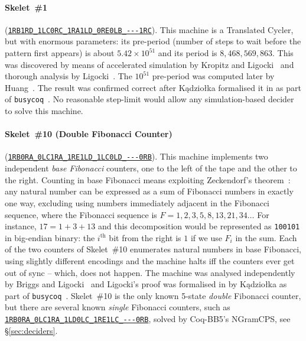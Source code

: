\documentclass[sigconf,screen]{acmart}
\theoremstyle{definition} %
\numberwithin{equation}{section}
\theoremstyle{definition} %
\newcommand{\tm}[1]{\href{https://bbchallenge.org/#1}{\texttt{\nolinkurl{#1}}}}
\newcommand{\TC}{Translated Cycler\xspace}
\newcommand{\CoqBB}{Coq-BB5\xspace}
\begin{document}
\paragraph{Skelet~\#1} (\tm{1RB1RD\_1LC0RC\_1RA1LD\_0RE0LB\_---1RC}). This machine is a \TC, but with enormous parameters: its pre-period (number of steps to wait before the pattern first appears) is about $5.42 \times 10^{51}$ and its period is $8{,}468{,}569{,}863$. This was discovered by means of accelerated simulation by Kropitz and Ligocki~\cite{uniSk1} and thorough analysis by Ligocki~\cite{ShawnSkelet1Before,ShawnSkelet1}. The $10^{51}$ pre-period was computed later by Huang~\cite{hipparcosSk1}. The result was confirmed correct after K\k{a}dzio{\l}ka formalised it in \Coq as part of \texttt{busycoq}~\cite{busycoq}. No reasonable step-limit would allow any simulation-based decider to solve this machine.

\paragraph{Skelet~\#10 (Double Fibonacci Counter)} (\tm{1RB0RA\_0LC1RA\_1RE1LD\_1LC0LD\_---0RB}). This machine implements two independent \textit{base Fibonacci} counters, one to the left of the tape and the other to the right. Counting in base Fibonacci means exploiting Zeckendorf's theorem~\cite{wiki:Zeckendorf's_theorem}: any natural number can be expressed as a sum of Fibonacci numbers in exactly one way, excluding using numbers immediately adjacent in the Fibonacci sequence, where the Fibonacci sequence is $F = 1,2,3,5,8,13,21,34\dots$ For instance, $17 = 1 + 3 + 13$ and this decomposition would be represented as \texttt{100101} in big-endian binary: the $i^\text{th}$ bit from the right is $1$ if we use $F_i$ in the sum. Each of the two counters of Skelet~\#10 enumerates natural numbers in base Fibonacci, using slightly different encodings and the machine halts iff the counters ever get out of sync -- which, does not happen. The machine was analysed independently by Briggs and Ligocki~\cite{DanBriggs,ShawnSkelet10} and Ligocki's proof was formalised in \Coq by K\k{a}dzio{\l}ka as part of \texttt{busycoq}~\cite{busycoq}. Skelet~\#10 is the only known 5-state \textit{double} Fibonacci counter, but there are several known \textit{single} Fibonacci counters, such as \tm{1RB0RA\_0LC1RA\_1LD0LC\_1RE1LC\_---0RB}, solved by \CoqBB's NGramCPS, see \S\ref{sec:deciders}.
\end{document}
